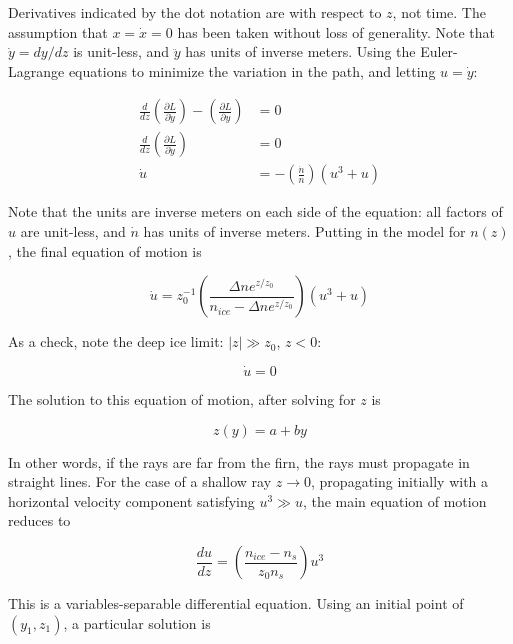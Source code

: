 \documentclass[12pt]{article}
\begin{document}
Derivatives indicated by the dot notation are with respect to $z$, not time.  The assumption that $x = \dot{x} = 0$ has been taken without loss of generality.  Note that $\dot{y} = dy/dz$ is unit-less, and $\ddot{y}$ has units of inverse meters.  Using the Euler-Lagrange equations to minimize the variation in the path, and letting $u = \dot{y}$:

\begin{align}
\frac{d}{dz} \left( \frac{\partial L}{\partial \dot{y}} \right) - \left( \frac{\partial L}{\partial y} \right) &= 0 \\
\frac{d}{dz} \left( \frac{\partial L}{\partial \dot{y}} \right) &= 0 \\
\dot{u} &= - \left( \frac{\dot{n}}{n} \right) (u^3+u) \label{eq:main}
\end{align}

Note that the units are inverse meters on each side of the equation: all factors of $u$ are unit-less, and $\dot{n}$ has units of inverse meters.  Putting in the model for $n(z)$, the final equation of motion is

\begin{equation}
\boxed{
\dot{u} = z_0^{-1} \left( \frac{\Delta n e^{z/z_0}}{n_{ice} - \Delta n e^{z/z_0}} \right) (u^3+u)
}
\end{equation}

As a check, note the deep ice limit: $|z| \gg z_0$, $z<0$:

\begin{equation}
\dot{u} = 0
\end{equation}

The solution to this equation of motion, after solving for $z$ is 

\begin{equation}
z(y) = a+by
\end{equation}

In other words, if the rays are far from the firn, the rays must propagate in straight lines.  For the case of a shallow ray $z \rightarrow 0$, propagating initially with a horizontal velocity component satisfying $u^3 \gg u$, the main equation of motion reduces to 

\begin{equation}
\frac{du}{dz} = \left( \frac{n_{ice} - n_s}{z_0 n_s}\right) u^3
\end{equation}

This is a variables-separable differential equation.  Using an initial point of $(y_1,z_1)$, a particular solution is
\end{document}
